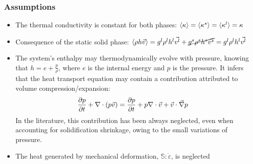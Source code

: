 \subsubsection{Assumptions}
\begin{itemize}
\itemsep0em
\item The thermal conductivity is constant for both phases: $\langle \kappa \rangle = \langle \kappa^s \rangle = \langle \kappa^l \rangle= \kappa $ 
\item Consequence of the static solid phase: $\langle \rho h \vec{v} \rangle = {g^l} \rho^l h^l \vec{v^l} +  \cancel{{g^s} \rho^s h^s \vec{v^s}} = {g^l} \rho^l h^l \vec{v^l}$ 
\item The system's enthalpy may thermodynamically evolve with pressure, knowing that $h=e+\frac{p}{\rho}$, where $e$ is the internal energy and $p$ is the pressure. It infers that the heat transport
equation may contain a contribution attributed to volume compression/expansion:
\begin{align}
			 \frac{\partial p}{\partial t}+\nabla \cdot \left( p \vec{v} \right)
			 = \frac{\partial p}{\partial t}+ p \nabla \cdot \vec{v} + \vec{v} \cdot \vec{\nabla} p 
\end{align}
In the literature, this contribution has been always neglected, even when accounting for solidification
shrinkage, owing to the small variations of pressure.
\item The heat generated by mechanical deformation, $\mathbb{S}:\dot{\varepsilon}$, is neglected
\end{itemize}
